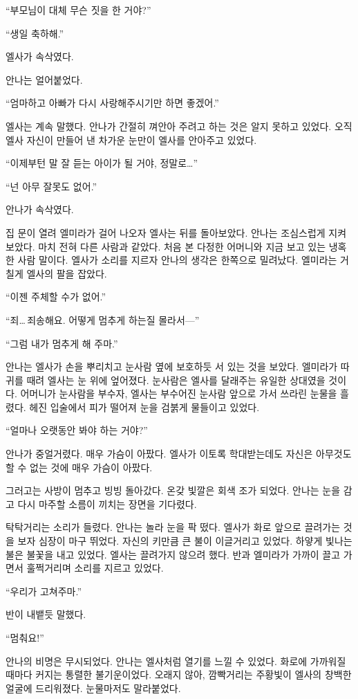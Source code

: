 ``부모님이 대체 무슨 짓을 한 거야?''

``생일 축하해.''

엘사가 속삭였다.

안나는 얼어붙었다.

``엄마하고 아빠가 다시 사랑해주시기만 하면 좋겠어.''

엘사는 계속 말했다. 안나가 간절히 껴안아 주려고 하는 것은 알지 못하고 있었다. 오직 엘사 자신이 만들어 낸 차가운 눈만이 엘사를 안아주고 있었다.

``이제부턴 말 잘 듣는 아이가 될 거야, 정말로\ldots''

``넌 아무 잘못도 없어.''

안나가 속삭였다.

집 문이 열려 엘미라가 걸어 나오자 엘사는 뒤를 돌아보았다. 안나는 조심스럽게 지켜보았다. 마치 전혀 다른 사람과 같았다. 처음 본 다정한 어머니와 지금 보고 있는 냉혹한 사람 말이다. 엘사가 소리를 지르자 안나의 생각은 한쪽으로 밀려났다. 엘미라는 거칠게 엘사의 팔을 잡았다.

``이젠 주체할 수가 없어.''

``죄\ldots\,죄송해요. 어떻게 멈추게 하는질 몰라서—''

``그럼 내가 멈추게 해 주마.''

안나는 엘사가 손을 뿌리치고 눈사람 옆에 보호하듯 서 있는 것을 보았다. 엘미라가 따귀를 때려 엘사는 눈 위에 엎어졌다. 눈사람은 엘사를 달래주는 유일한 상대였을 것이다. 어머니가 눈사람을 부수자, 엘사는 부수어진 눈사람 앞으로 가서 쓰라린 눈물을 흘렸다. 헤진 입술에서 피가 떨어져 눈을 검붉게 물들이고 있었다.

``얼마나 오랫동안 봐야 하는 거야?''

안나가 중얼거렸다. 매우 가슴이 아팠다. 엘사가 이토록 학대받는데도 자신은 아무것도 할 수 없는 것에 매우 가슴이 아팠다.

그러고는 사방이 멈추고 빙빙 돌아갔다. 온갖 빛깔은 회색 조가 되었다. 안나는 눈을 감고 다시 마주할 소름이 끼치는 장면을 기다렸다.

탁탁거리는 소리가 들렸다. 안나는 놀라 눈을 팍 떴다. 엘사가 화로 앞으로 끌려가는 것을 보자 심장이 마구 뛰었다. 자신의 키만큼 큰 불이 이글거리고 있었다. 하얗게 빛나는 불은 불꽃을 내고 있었다. 엘사는 끌려가지 않으려 했다. 반과 엘미라가 가까이 끌고 가면서 훌쩍거리며 소리를 지르고 있었다.

``우리가 고쳐주마.''

반이 내뱉듯 말했다.

``멈춰요!''

안나의 비명은 무시되었다. 안나는 엘사처럼 열기를 느낄 수 있었다. 화로에 가까워질 때마다 커지는 통렬한 불기운이었다. 오래지 않아, 깜빡거리는 주황빛이 엘사의 창백한 얼굴에 드리워졌다. 눈물마저도 말라붙었다.

